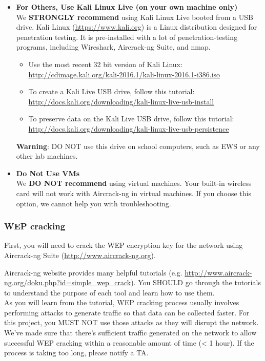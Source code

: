 \begin{itemize}
  \item \textbf{For Others, Use Kali Linux Live (on your own machine only)}\\
  We \textbf{STRONGLY recommend} using Kali Linux Live booted from a USB drive.
  Kali Linux (\url{https://www.kali.org}) is a Linux distribution designed for penetration testing.
  It is pre-installed with a lot of penetration-testing programs, including Wireshark, Aircrack-ng Suite, and nmap.
  \begin{itemize}[nosep]
    \item Use the most recent 32 bit version of Kali Linux:\\
    \url{http://cdimage.kali.org/kali-2016.1/kali-linux-2016.1-i386.iso}
    \item To create a Kali Live USB drive, follow this tutorial:\\
    \url{http://docs.kali.org/downloading/kali-linux-live-usb-install}
    \item To preserve data on the Kali Live USB drive, follow this tutorial:\\
    \url{http://docs.kali.org/downloading/kali-linux-live-usb-persistence}
  \end{itemize}
  \textbf{Warning}: DO NOT use this drive on school computers, such as EWS or any other lab machines.

  \item \textbf{Do Not Use VMs}\\
  We \textbf{DO NOT recommend} using virtual machines.
  Your built-in wireless card will not work with Aircrack-ng in virtual machines.
  If you choose this option, we cannot help you with troubleshooting.

\end{itemize}

\pagebreak

\subsubsection*{WEP cracking}
First, you will need to crack the WEP encryption key for the network using Aircrack-ng Suite (\url{http://www.aircrack-ng.org}).

\smallskip

Aircrack-ng website provides many helpful tutorials (e.g. \url{http://www.aircrack-ng.org/doku.php?id=simple\_wep\_crack}).
You SHOULD go through the tutorials to understand the purpose of each tool and learn how to use them.\\
As you will learn from the tutorial, WEP cracking process usually involves performing attacks to generate traffic so that data can be collected faster.
For this project, you MUST NOT use those attacks as they will disrupt the network.\\
We've made sure that there's sufficient traffic generated on the network to allow successful WEP cracking within a reasonable amount of time (< 1 hour).
If the process is taking too long, please notify a TA.

